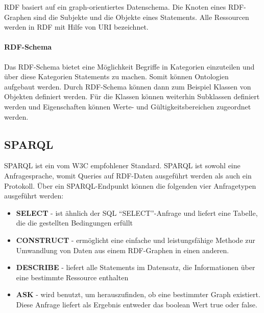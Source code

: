 \ac{RDF} basiert auf ein graph-orientiertes Datenschema.
Die Knoten eines RDF-Graphen sind die Subjekte und die Objekte eines Statements.
Alle Ressourcen werden in RDF mit Hilfe von \ac{URI} bezeichnet.

\paragraph{RDF-Schema} 

Das RDF-Schema bietet eine Möglichkeit Begriffe in Kategorien einzuteilen und über diese Kategorien Statements zu machen.
Somit können Ontologien aufgebaut werden.
Durch RDF-Schema können dann zum Beispiel Klassen von Objekten definiert werden.
Für die Klassen können weiterhin Subklassen definiert werden und Eigenschaften können Werte- und Gültigkeitsbereichen zugeordnet werden. \citep[vgl.]{pellegrinix}

\subsection{SPARQL} 

\ac{SPARQL} ist ein vom W3C empfohlener Standard.
\ac{SPARQL} ist sowohl eine Anfragesprache, womit Queries auf RDF-Daten ausgeführt werden als auch ein Protokoll. \citep[vgl.]{hitzler}
Über ein \ac{SPARQL}-Endpunkt können die folgenden vier Anfragetypen ausgeführt werden:

\begin{itemize}
\item \textbf{SELECT} - ist ähnlich der SQL \enquote{SELECT}-Anfrage und liefert eine Tabelle, die die gestellten Bedingungen erfüllt
\item \textbf{CONSTRUCT} - ermöglicht eine einfache und leistungsfähige Methode zur Umwandlung von Daten aus einem RDF-Graphen in einen anderen.
\item \textbf{DESCRIBE} - liefert alle Statements im Datensatz, die Informationen über eine bestimmte Ressource enthalten
\item \textbf{ASK} - wird benutzt, um herauszufinden, ob eine bestimmter Graph existiert. Diese Anfrage liefert als Ergebnis entweder das boolean Wert true oder false. \citep[vgl.]{hebeler_semantic_2009}
\end{itemize}






